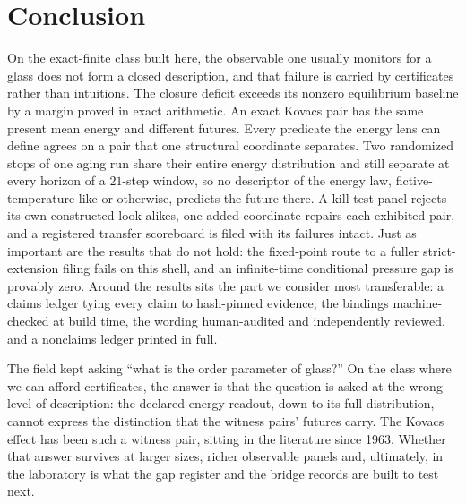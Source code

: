 \section{Conclusion}
\label{sec:conclusion}

On the exact-finite class built here, the observable one usually monitors for a glass does not form
a closed description, and that failure is carried by certificates rather than intuitions. The
closure deficit exceeds its nonzero equilibrium baseline by a margin proved in exact arithmetic.
An exact Kovacs pair has the same present mean energy and different futures. Every predicate the
energy lens can define agrees on a pair that one structural coordinate separates. Two randomized
stops of one aging run share their entire energy distribution and still separate at every horizon
of a $21$-step window, so no descriptor of the energy law, fictive-temperature-like or otherwise,
predicts the future there. A kill-test panel rejects its own constructed look-alikes, one added
coordinate repairs each exhibited pair, and a registered transfer scoreboard is filed with its
failures intact. Just as important are the results that do not hold: the fixed-point route to a
fuller strict-extension filing fails on this shell, and an infinite-time conditional pressure gap
is provably zero. Around the results sits the part we consider most transferable: a claims ledger
tying every claim to hash-pinned evidence, the bindings machine-checked at build time, the wording
human-audited and independently reviewed, and a nonclaims ledger printed in full.

The field kept asking ``what is the order parameter of glass?'' On the class where we can afford
certificates, the answer is that the question is asked at the wrong level of description: the
declared energy readout, down to its full distribution, cannot express the distinction that the
witness pairs' futures carry. The Kovacs effect has been such a witness pair, sitting in the
literature since 1963. Whether that answer survives at larger sizes, richer observable panels and,
ultimately, in the laboratory is what the gap register and the bridge records are built to test
next.

